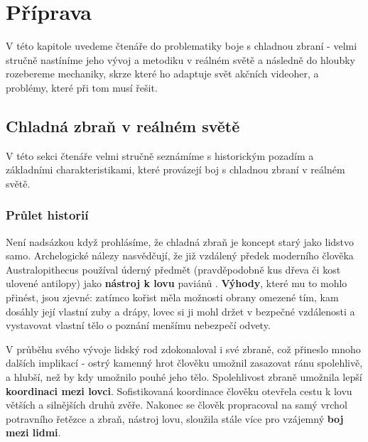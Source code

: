 \chapter{Příprava} \label{swordfightingIntroChapter}
V této kapitole uvedeme čtenáře do problematiky boje s chladnou zbraní - velmi stručně nastíníme jeho vývoj a metodiku v reálném světě a následně do hloubky rozebereme mechaniky, skrze které ho adaptuje svět akčních videoher, a problémy, které při tom musí řešit.


\section{Chladná zbraň v reálném světě}
V této sekci čtenáře velmi stručně seznámíme s historickým pozadím a základními charakteristikami, které provázejí boj s chladnou zbraní v reálném světě.

\subsection{Průlet historií}

Není nadsázkou když prohlásíme, že chladná zbraň je koncept starý jako lidstvo samo. Archelogické nálezy nasvědčují, že již vzdálený předek moderního člověka Australopithecus používal úderný předmět (pravděpodobně kus dřeva či kost ulovené antilopy) jako \textbf{nástroj k lovu} paviánů \cite{AustralopithecusWeapon}. \textbf{Výhody}, které mu to mohlo přinést, jsou zjevné: zatímco kořist měla možnosti obrany omezené tím, kam dosáhly její vlastní zuby a drápy, lovec si ji mohl držet v bezpečné vzdálenosti a vystavovat vlastní tělo o poznání menšímu nebezpečí odvety.

V průběhu svého vývoje lidský rod zdokonaloval i své zbraně, což přineslo mnoho dalších implikací - ostrý kamenný hrot člověku umožnil zasazovat ránu spolehlivě, a hlubší, než by kdy umožnilo pouhé jeho tělo. Spolehlivost zbraně umožnila lepší \textbf{koordinaci mezi lovci}. Sofistikovaná koordinace člověku otevřela cestu k lovu větších a silnějších druhů zvěře. Nakonec se člověk propracoval na samý vrchol potravního řetězce a zbraň, nástroj lovu, sloužila stále více pro vzájemný \textbf{boj mezi lidmi}. 

